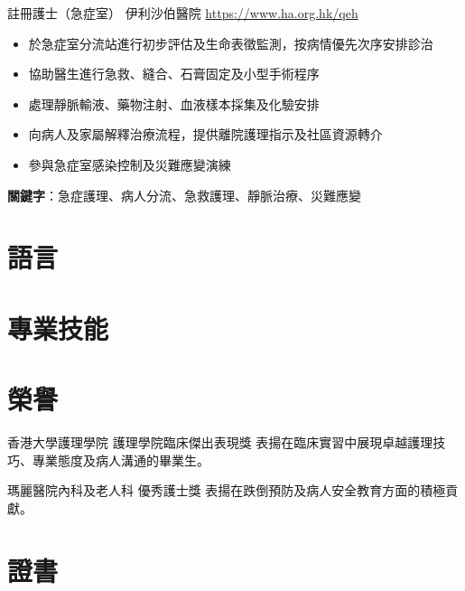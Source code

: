 \documentclass[a4paper, serif, 10pt]{moderncv}
\begin{document}
        {註冊護士（急症室）}
        {伊利沙伯醫院}
        {\url{https://www.ha.org.hk/qeh}}
        {}
        {\begin{itemize}
\item 於急症室分流站進行初步評估及生命表徵監測，按病情優先次序安排診治
\item 協助醫生進行急救、縫合、石膏固定及小型手術程序
\item 處理靜脈輸液、藥物注射、血液樣本採集及化驗安排
\item 向病人及家屬解釋治療流程，提供離院護理指示及社區資源轉介
\item 參與急症室感染控制及災難應變演練
\end{itemize}
\textbf{關鍵字}：急症護理、病人分流、急救護理、靜脈治療、災難應變}
\section{語言}

\section{專業技能}

\section{榮譽}

        {香港大學護理學院}
        {護理學院臨床傑出表現獎}
        {}
        {}
        {表揚在臨床實習中展現卓越護理技巧、專業態度及病人溝通的畢業生。}

        {瑪麗醫院內科及老人科}
        {優秀護士獎}
        {}
        {}
        {表揚在跌倒預防及病人安全教育方面的積極貢獻。}
\section{證書}
\end{document}
